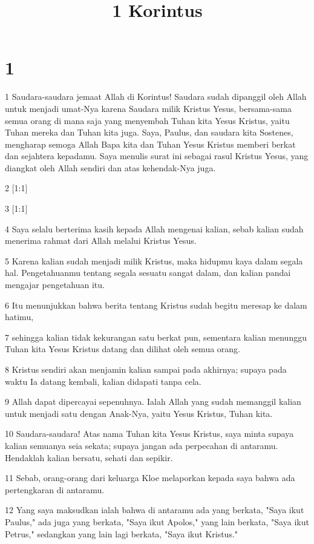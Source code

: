 

\title{1 Korintus}


\chapter{1}

\par 1 Saudara-saudara jemaat Allah di Korintus! Saudara sudah dipanggil oleh Allah untuk menjadi umat-Nya karena Saudara milik Kristus Yesus, bersama-sama semua orang di mana saja yang menyembah Tuhan kita Yesus Kristus, yaitu Tuhan mereka dan Tuhan kita juga. Saya, Paulus, dan saudara kita Sostenes, mengharap semoga Allah Bapa kita dan Tuhan Yesus Kristus memberi berkat dan sejahtera kepadamu. Saya menulis surat ini sebagai rasul Kristus Yesus, yang diangkat oleh Allah sendiri dan atas kehendak-Nya juga.
\par 2 [1:1]
\par 3 [1:1]
\par 4 Saya selalu berterima kasih kepada Allah mengenai kalian, sebab kalian sudah menerima rahmat dari Allah melalui Kristus Yesus.
\par 5 Karena kalian sudah menjadi milik Kristus, maka hidupmu kaya dalam segala hal. Pengetahuanmu tentang segala sesuatu sangat dalam, dan kalian pandai mengajar pengetahuan itu.
\par 6 Itu menunjukkan bahwa berita tentang Kristus sudah begitu meresap ke dalam hatimu,
\par 7 sehingga kalian tidak kekurangan satu berkat pun, sementara kalian menunggu Tuhan kita Yesus Kristus datang dan dilihat oleh semua orang.
\par 8 Kristus sendiri akan menjamin kalian sampai pada akhirnya; supaya pada waktu Ia datang kembali, kalian didapati tanpa cela.
\par 9 Allah dapat dipercayai sepenuhnya. Ialah Allah yang sudah memanggil kalian untuk menjadi satu dengan Anak-Nya, yaitu Yesus Kristus, Tuhan kita.
\par 10 Saudara-saudara! Atas nama Tuhan kita Yesus Kristus, saya minta supaya kalian semuanya seia sekata; supaya jangan ada perpecahan di antaramu. Hendaklah kalian bersatu, sehati dan sepikir.
\par 11 Sebab, orang-orang dari keluarga Kloe melaporkan kepada saya bahwa ada pertengkaran di antaramu.
\par 12 Yang saya maksudkan ialah bahwa di antaramu ada yang berkata, "Saya ikut Paulus," ada juga yang berkata, "Saya ikut Apolos," yang lain berkata, "Saya ikut Petrus," sedangkan yang lain lagi berkata, "Saya ikut Kristus."
